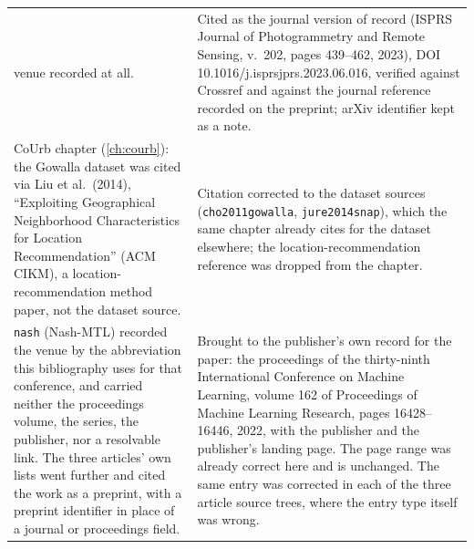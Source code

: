 {\begin{longtable}{@{}p{}p{}@{}}
venue recorded at all. &
Cited as the journal version of record (ISPRS Journal of Photogrammetry and Remote
Sensing, v.~202, pages 439--462, 2023), DOI 10.1016/j.isprsjprs.2023.06.016, verified
against Crossref and against the journal reference recorded on the preprint; arXiv
identifier kept as a note. \\
\addlinespace
CoUrb chapter (\ref{ch:courb}): the Gowalla dataset was cited via Liu et al.\ (2014),
``Exploiting Geographical Neighborhood Characteristics for Location Recommendation''
(ACM CIKM), a location-recommendation method paper, not the dataset source. &
Citation corrected to the dataset sources (\texttt{cho2011gowalla},
\texttt{jure2014snap}), which the same chapter already cites for the dataset
elsewhere; the location-recommendation reference was dropped from the chapter. \\
\addlinespace
\texttt{nash} (Nash-MTL) recorded the venue by the abbreviation this bibliography uses for
that conference, and carried neither the proceedings volume, the series, the publisher, nor
a resolvable link. The three articles' own lists went further and cited the work as a
preprint, with a preprint identifier in place of a journal or proceedings field. &
Brought to the publisher's own record for the paper: the proceedings of the thirty-ninth
International Conference on Machine Learning, volume 162 of Proceedings of Machine Learning
Research, pages 16428--16446, 2022, with the publisher and the publisher's landing page. The
page range was already correct here and is unchanged. The same entry was corrected in each of
the three article source trees, where the entry type itself was wrong. \\
\end{longtable}
}
